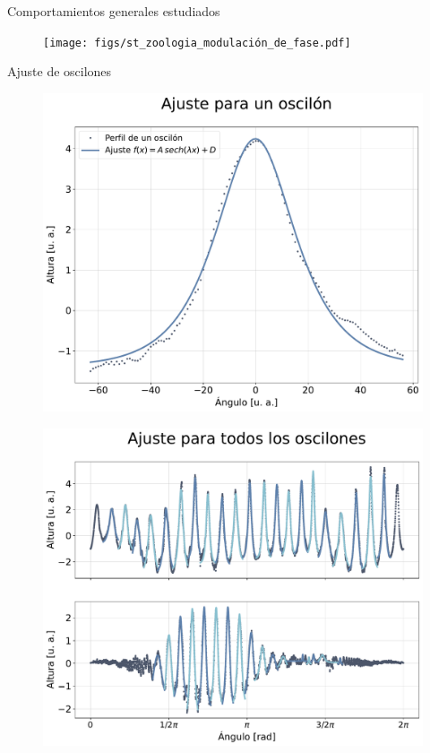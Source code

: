 \documentclass[aspectratio=169]{beamer}
\begin{document}
\begin{frame}{Comportamientos generales estudiados}
\begin{minipage}{0.30\textwidth}
\begin{figure}
	  \end{figure}
	\end{minipage} \hfill
	\begin{minipage}{0.30\textwidth}
	  \begin{figure}
		\texttt{[image: figs/st\_zoologia\_modulación\_de\_fase.pdf]}
	  \end{figure}
	\end{minipage}
\end{frame}

\begin{frame}{Ajuste de oscilones} %
	\begin{minipage}{0.46\textwidth}
	  \begin{figure}
	    \includegraphics[width=\linewidth]{figs/fit_one_osc.pdf}
	  \end{figure}
	\end{minipage} \hfill
	\begin{minipage}{0.46\textwidth}
	  \begin{figure}
	    \includegraphics[width=\linewidth]{figs/fit_all_osc.pdf}

\end{figure}
\end{minipage}
\end{frame}
\end{document}
